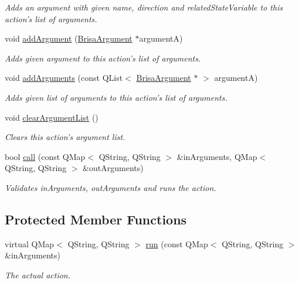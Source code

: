 \begin{DoxyCompactItemize}
\begin{DoxyCompactList}\small\item\em Adds an argument with given {\itshape name\/}, {\itshape direction\/} and {\itshape relatedStateVariable\/} to this action's list of arguments. \item\end{DoxyCompactList}\item 
void \hyperlink{classBrisaUpnp_1_1BrisaAction_a991ec9631fdec0971575c0974e8a564b}{addArgument} (\hyperlink{classBrisaUpnp_1_1BrisaArgument}{BrisaArgument} $\ast$argumentA)
\begin{DoxyCompactList}\small\item\em Adds given {\itshape argument\/} to this action's list of arguments. \item\end{DoxyCompactList}\item 
void \hyperlink{classBrisaUpnp_1_1BrisaAction_a006f4ddaab49e8935d531fef07e44129}{addArguments} (const QList$<$ \hyperlink{classBrisaUpnp_1_1BrisaArgument}{BrisaArgument} $\ast$ $>$ argumentA)
\begin{DoxyCompactList}\small\item\em Adds given list of {\itshape arguments\/} to this action's list of arguments. \item\end{DoxyCompactList}\item 
void \hyperlink{classBrisaUpnp_1_1BrisaAction_a21f3042b8aea2ab6e9ce0f4e5535be60}{clearArgumentList} ()
\begin{DoxyCompactList}\small\item\em Clears this action's argument list. \item\end{DoxyCompactList}\item 
bool \hyperlink{classBrisaUpnp_1_1BrisaAction_a1a419879e79f7979377ef7a9ae1bfa9b}{call} (const QMap$<$ QString, QString $>$ \&inArguments, QMap$<$ QString, QString $>$ \&outArguments)
\begin{DoxyCompactList}\small\item\em Validates {\itshape inArguments\/}, {\itshape outArguments\/} and runs the action. \item\end{DoxyCompactList}\end{DoxyCompactItemize}
\subsection*{Protected Member Functions}
\begin{DoxyCompactItemize}
\item 
virtual QMap$<$ QString, QString $>$ \hyperlink{classBrisaUpnp_1_1BrisaAction_aca2fe8881b0abe570222f31856040424}{run} (const QMap$<$ QString, QString $>$ \&inArguments)
\begin{DoxyCompactList}\small\item\em The actual action. \item\end{DoxyCompactList}\end{DoxyCompactItemize}


